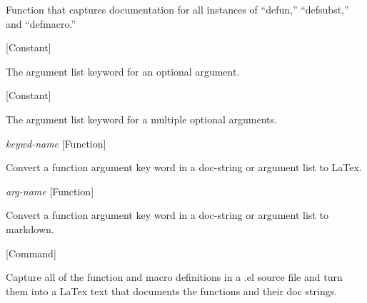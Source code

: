 \begin{doc-string}
Function that captures documentation for all instances of ``defun,'' ``defsubst,''
and ``defmacro.''
\end{doc-string}

\vspace{1em}
\noindent
{}
\usebox{\funcname}
 \hfill [Constant]

\begin{doc-string}
The argument list keyword for an optional argument.
\end{doc-string}

\vspace{1em}
\noindent
{}
\usebox{\funcname}
 \hfill [Constant]

\begin{doc-string}
The argument list keyword for a multiple optional arguments.
\end{doc-string}

\vspace{1em}
\noindent
{}
\usebox{\funcname}\emph{keywd-name}
 \hfill [Function]

\begin{doc-string}
Convert a function argument key word in a doc-string or argument list
to LaTex.
\end{doc-string}

\vspace{1em}
\noindent
{}
\usebox{\funcname}\emph{arg-name}
 \hfill [Function]

\begin{doc-string}
Convert a function argument key word in a doc-string or argument list
to markdown.
\end{doc-string}

\vspace{1em}
\noindent
{}
\usebox{\funcname}
 \hfill [Command]

\begin{doc-string}
Capture all of the function and macro definitions in a .el source file and turn
them into a LaTex text that documents the functions and their doc strings.
\end{doc-string}

